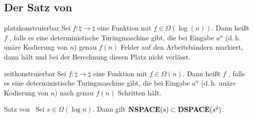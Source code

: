 \pagebreak

\subsection{%
    Der Satz von %
}

\begin{Def}{platzkonstruierbar}
    Sei $f\colon \natural \rightarrow \natural$ eine Funktion mit $f \in \Omega(\log(n))$.
    Dann heißt $f$ , falls es eine deterministische Turingmaschine
    gibt, die bei Eingabe $a^n$ (d.\,h. unäre Kodierung von $n$) genau $f(n)$ Felder auf den
    Arbeitsbändern markiert, dann hält und bei der Berechnung diesen Platz nicht verlässt.
\end{Def}

\begin{Def}{zeitkonstruierbar}
    Sei $f\colon \natural \rightarrow \natural$ eine Funktion mit $f \in \Omega(n)$.
    Dann heißt $f$ , falls es eine deterministische Turingmaschine
    gibt, die bei Eingabe $a^n$ (d.\,h. unäre Kodierung von $n$) nach genau $f(n)$ Schritten
    hält.
\end{Def}

\linie

\begin{Satz}{Satz von \upshape\,\!}
    Sei $s \in \Omega(\log n)$.
    Dann gilt $\mathbf{NSPACE}(s) \subset \mathbf{DSPACE}(s^2)$.
\end{Satz}

